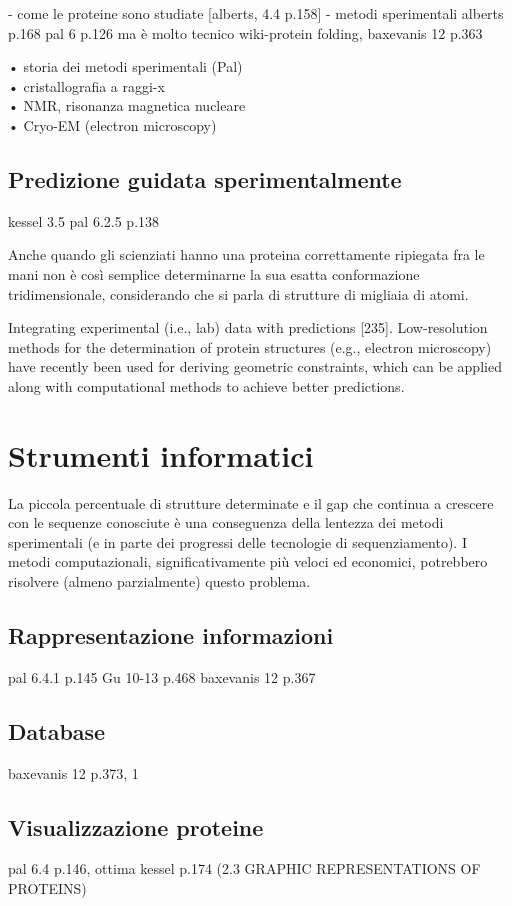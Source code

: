 - come le proteine sono studiate [alberts, 4.4 p.158]
- metodi sperimentali 
alberts p.168
pal 6 p.126 ma è molto tecnico
wiki-protein folding, 
baxevanis 12 p.363

• storia dei metodi sperimentali (Pal) \\
• cristallografia a raggi-x \\
• NMR, risonanza magnetica nucleare \\
• Cryo-EM (electron microscopy) \\
\subsection{Predizione guidata sperimentalmente}
kessel 3.5
pal 6.2.5 p.138

Anche quando gli scienziati hanno una proteina correttamente ripiegata fra le mani non è così semplice determinarne la sua esatta conformazione tridimensionale, considerando che si parla di strutture di migliaia di atomi.

 Integrating experimental (i.e., lab) data with predictions [235]. Low-resolution
methods for the determination of protein structures (e.g., electron microscopy) have
recently been used for deriving geometric constraints, which can be applied along
with computational methods to achieve better predictions.

\section{Strumenti informatici}
La piccola percentuale di strutture determinate e il gap che continua a crescere con le sequenze conosciute è una conseguenza della lentezza dei metodi sperimentali (e in parte dei progressi delle tecnologie di sequenziamento). I metodi computazionali, significativamente più veloci ed economici, potrebbero risolvere (almeno parzialmente) questo problema.

\subsection{Rappresentazione informazioni}
pal 6.4.1 p.145
Gu 10-13 p.468
baxevanis 12 p.367

\subsection{Database}
baxevanis 12 p.373, 1

\subsection{Visualizzazione proteine}
pal 6.4 p.146, ottima
kessel p.174 (2.3 GRAPHIC REPRESENTATIONS OF PROTEINS)
